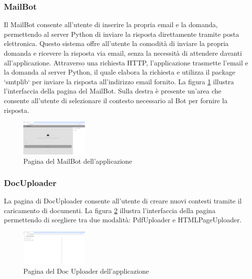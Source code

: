 \subsubsection{MailBot}
Il MailBot consente all'utente di inserire la propria email e la domanda, permettendo al server Python di inviare la risposta direttamente tramite posta elettronica. Questo sistema offre all'utente la comodità di inviare la propria domanda e ricevere la risposta via email, senza la necessità di attendere davanti all'applicazione.
Attraverso una richiesta HTTP, l'applicazione trasmette l'email e la domanda al server Python, il quale elabora la richiesta e utilizza il package `smtplib` per inviare la risposta all'indirizzo email fornito.
La figura \ref{fig:mailbot} illustra l'interfaccia della pagina del MailBot. Sulla destra è presente un'area che consente all'utente di selezionare il contesto necessario al Bot per fornire la risposta.
\begin{figure}[ht]
	\centering
	\includegraphics[width=0.3\textwidth]{Immagini/mailbot.png}
	\caption{Pagina del MailBot dell'applicazione}
	\label{fig:mailbot}
\end{figure}

\subsubsection{DocUploader}
La pagina di DocUploader consente all'utente di creare nuovi contesti tramite il caricamento di documenti.
La figura \ref{fig:doc_uploader_page} illustra l'interfaccia della pagina permettendo di scegliere tra due modalità: PdfUploader e HTMLPageUploader.
\begin{figure}[ht]
	\centering
	\includegraphics[width=0.3\textwidth]{Immagini/doc_uploader_page.png}
	\caption{Pagina del Doc Uploader dell'applicazione}
	\label{fig:doc_uploader_page}
\end{figure}

